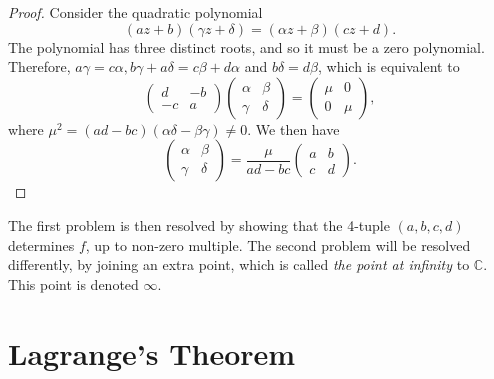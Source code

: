 \documentclass[12pt]{book}
\newcommand{\CC}{\mathbb C}
\theoremstyle{definition}
\theoremstyle{remark}
\begin{document}
		\begin{proof}
			Consider the quadratic polynomial
			\begin{equation*}
				(az + b)(\gamma z + \delta) = (\alpha z + \beta)(cz + d).
			\end{equation*}
			The polynomial has three distinct roots, and so it must be a zero polynomial. Therefore, $a\gamma = c\alpha, b\gamma + a \delta = c\beta + d\alpha$ and $b\delta = d\beta$, which is equivalent to
			\begin{equation*}
				\begin{pmatrix}
					d & -b\\
					-c & a
				\end{pmatrix}
				\begin{pmatrix}
				\alpha & \beta \\
				\gamma & \delta
				\end{pmatrix}
				=
				\begin{pmatrix}
					\mu		&	0\\
					0		& \mu
				\end{pmatrix},
			\end{equation*}
			where $\mu^2 = {(ad - bc)}{(\alpha\delta - \beta\gamma)}{ \neq 0}$. We then have
			\begin{equation*}
				\begin{pmatrix}
				\alpha & \beta \\
				\gamma & \delta
				\end{pmatrix}
				= \frac{\mu}{ad - bc}\begin{pmatrix}
				a & b \\
				c & d
				\end{pmatrix}.
			\end{equation*}%
		\end{proof}
		The first problem is then resolved by showing that the 4-tuple $(a,b,c,d)$ determines $f$, up to non-zero multiple. The second problem will be resolved differently, by joining an extra point, which is called \textit{the point at infinity} to $\CC$. This point is denoted $\infty$.
	
	
		\section{Lagrange's Theorem}
\end{document}
